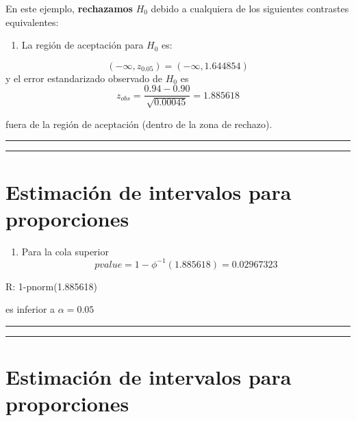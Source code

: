 \documentclass[
]{book}
\providecommand{\tightlist}{%
  \setlength{\itemsep}{0pt}\setlength{\parskip}{0pt}}
\begin{document}
En este ejemplo, \textbf{rechazamos} \(H_0\) debido a cualquiera de los siguientes contrastes equivalentes:

\begin{enumerate}
\def\labelenumi{\arabic{enumi}.}
\tightlist
\item
  La región de aceptación para \(H_0\) es:
\end{enumerate}

\[(-\infty, z_{0.05})=( -\infty, 1.644854)\]
y el error estandarizado observado de \(H_0\) es
\[z_{obs} = \frac{0.94-0.90}{\sqrt{0.00045}}=1.885618\]

fuera de la región de aceptación (dentro de la zona de rechazo).

\begin{center}\rule{0.5\linewidth}{0.5pt}\end{center}

\begin{center}\rule{0.5\linewidth}{0.5pt}\end{center}

\hypertarget{estimaciuxf3n-de-intervalos-para-proporciones-3}{%
\section{Estimación de intervalos para proporciones}\label{estimaciuxf3n-de-intervalos-para-proporciones-3}}

\begin{enumerate}
\def\labelenumi{\arabic{enumi}.}
\setcounter{enumi}{1}
\tightlist
\item
  Para la cola superior \[pvalue=1-\phi^{-1}(1.885618)=0.02967323\]
\end{enumerate}

R: 1-pnorm(1.885618)

es inferior a \(\alpha=0.05\)

\begin{center}\rule{0.5\linewidth}{0.5pt}\end{center}

\begin{center}\rule{0.5\linewidth}{0.5pt}\end{center}

\hypertarget{estimaciuxf3n-de-intervalos-para-proporciones-4}{%
\section{Estimación de intervalos para proporciones}\label{estimaciuxf3n-de-intervalos-para-proporciones-4}}
\end{document}
